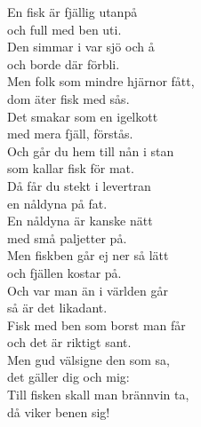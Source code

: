 \documentclass[12pt]{article}
\begin{document}
\noindent
\begin{minipage}{.45\textwidth}
	En fisk är fjällig utanpå\\
	och full med ben uti.\\
	Den simmar i var sjö och å\\
	och borde där förbli.\\
	
	\noindent
	Men folk som mindre hjärnor fått,\\
	dom äter fisk med sås.\\
	Det smakar som en igelkott\\
	med mera fjäll, förstås.\\
	
	\noindent
	Och går du hem till nån i stan\\
	som kallar fisk för mat.\\
	Då får du stekt i levertran\\
	en nåldyna på fat.\\
	
	\noindent
	En nåldyna är kanske nätt\\
	med små paljetter på.\\
	Men fiskben går ej ner så lätt\\
	och fjällen kostar på.\\
	
	\noindent
	Och var man än i världen går\\
	så är det likadant.\\
	Fisk med ben som borst man får\\
	och det är riktigt sant.\\
	
	\noindent
	Men gud välsigne den som sa,\\
	det gäller dig och mig:\\
	Till fisken skall man brännvin ta,\\
	då viker benen sig!\\
	
\end{minipage}%
\hspace{0.1\textwidth}
\noindent
\end{document}
